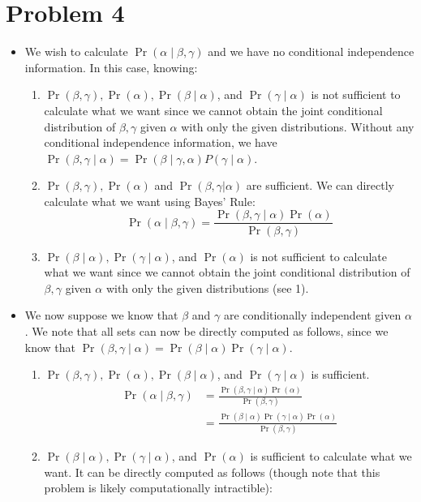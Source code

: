 \documentclass[12pt]{article}
\begin{document}
\section*{Problem 4}
\begin{itemize}
  \item We wish to calculate $\Pr(\alpha \mid \beta, \gamma)$ and we have no conditional independence information. In this case, knowing:
  \begin{enumerate}[label=\arabic*.]
  	\item $\Pr(\beta, \gamma), \Pr(\alpha), \Pr(\beta \mid \alpha)$, and $\Pr(\gamma \mid \alpha)$ is not sufficient to calculate what we want since we cannot obtain the joint conditional distribution of $\beta, \gamma$ given $\alpha$ with only the given distributions. Without any conditional independence information, we have $\Pr(\beta, \gamma \mid \alpha) = \Pr(\beta \mid \gamma, \alpha)P(\gamma \mid \alpha)$.
  	\item $\Pr(\beta, \gamma), \Pr(\alpha)$ and $\Pr(\beta, \gamma|\alpha)$ are sufficient. We can directly calculate what we want using Bayes' Rule:
  	$$
  		\Pr(\alpha \mid \beta, \gamma) = \frac{\Pr(\beta, \gamma \mid \alpha)\Pr(\alpha)}{\Pr(\beta, \gamma)}
  	$$
  	\item $\Pr(\beta \mid \alpha), \Pr(\gamma \mid \alpha)$, and $\Pr(\alpha)$ is not sufficient to calculate what we want since we cannot obtain the joint conditional distribution of $\beta, \gamma$ given $\alpha$ with only the given distributions (see 1).
 	\end{enumerate}
  \item We now suppose we know that $\beta$ and $\gamma$ are conditionally independent given $\alpha$. We note that all sets can now be directly computed as follows, since we know that $\Pr(\beta, \gamma \mid \alpha) = \Pr(\beta \mid\alpha)\Pr(\gamma \mid \alpha)$.
  \begin{enumerate}[label=\arabic*.]
  	\item $\Pr(\beta, \gamma), \Pr(\alpha), \Pr(\beta \mid \alpha)$, and $\Pr(\gamma \mid \alpha)$ is sufficient.
  	\begin{align*}
			\Pr(\alpha \mid \beta, \gamma) &= \frac{\Pr(\beta, \gamma \mid \alpha)\Pr(\alpha)}{\Pr(\beta, \gamma)} \tag{Bayes' Rule} \\
			&= \frac{\Pr(\beta \mid \alpha)\Pr(\gamma \mid \alpha)\Pr(\alpha)}{\Pr(\beta, \gamma)} \tag{Conditional Independence}
  	\end{align*}
  	\item $\Pr(\beta \mid \alpha), \Pr(\gamma \mid \alpha)$, and $\Pr(\alpha)$ is sufficient to calculate what we want. It can be directly computed as follows (though note that this problem is likely computationally intractible):

\end{enumerate}
\end{itemize}
\end{document}
